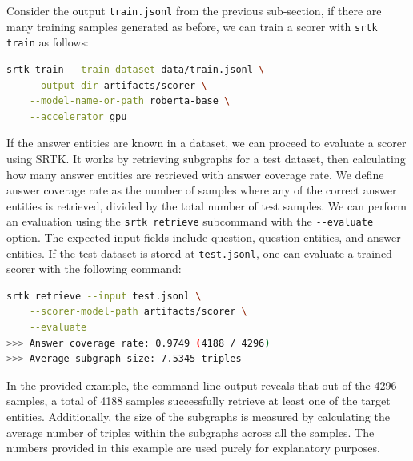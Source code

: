 \documentclass[runningheads]{llncs}
\begin{document}
Consider the output \texttt{train.jsonl} from the previous sub-section, if there are many training samples generated as before, we can train a scorer with \texttt{srtk train} as follows:

\begin{lstlisting}[language=bash]
srtk train --train-dataset data/train.jsonl \
    --output-dir artifacts/scorer \
    --model-name-or-path roberta-base \
    --accelerator gpu
\end{lstlisting}


If the answer entities are known in a dataset, we can proceed to evaluate a scorer using SRTK. It works by retrieving subgraphs for a test dataset, then calculating how many answer entities are retrieved with answer coverage rate. We define answer coverage rate as the number of samples where any of the correct answer entities is retrieved, divided by the total number of test samples. We can perform an evaluation using the \texttt{srtk retrieve} subcommand with the \texttt{-{}-evaluate} option. The expected input fields include question, question entities, and answer entities. If the test dataset is stored at \texttt{test.jsonl}, one can evaluate a trained scorer with the following command:

\begin{lstlisting}[language=bash]
srtk retrieve --input test.jsonl \
    --scorer-model-path artifacts/scorer \
    --evaluate
>>> Answer coverage rate: 0.9749 (4188 / 4296)
>>> Average subgraph size: 7.5345 triples
\end{lstlisting}

In the provided example, the command line output reveals that out of the 4296 samples, a total of 4188 samples successfully retrieve at least one of the target entities. Additionally, the size of the subgraphs is measured by calculating the average number of triples within the subgraphs across all the samples. The numbers provided in this example are used purely for explanatory purposes.


\end{document}
